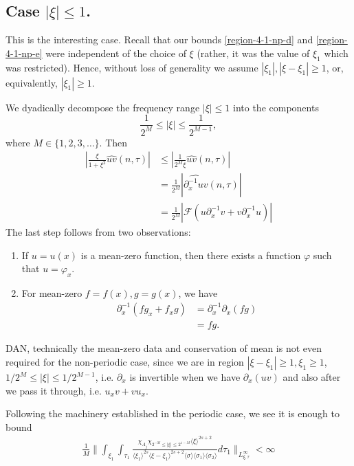 \documentclass[12pt,reqno]{amsart}
\numberwithin{equation}{section}  %
\newcommand{\wh}{\widehat}
\newcommand{\p}{\partial}
\begin{document}
\subsection{Case $| \xi| \le 1$.} 
\label{ssec:xisimxi1}

%
This is the interesting case. Recall that our bounds 
\eqref{region-4-1-np-d} and \eqref{region-4-1-np-e}
were independent of the choice of $\xi$ (rather, it was the value of $\xi_{1}$ which was restricted). Hence, without loss of generality we assume $| \xi_{1} |, | \xi - \xi_{1} | \ge 1$, or, equivalently, $|\xi_{1}| \ge 1$. 
\begin{framed}
We dyadically decompose the frequency range $| \xi | \le 1$ into the components \[\frac{1}{2^{M}} \le | \xi | \le \frac{1}{2^{M-1}},\] where $M \in \{1, 2, 3, \dots\}$. Then 
\begin{equation*}
\begin{split}
|\frac{\xi}{1 + \xi^{2}} \wh{uv}(n, \tau)| 
& \le | \frac{1}{2^{M} \xi} \wh{uv}(n, \tau)|
\\
& =\frac{1}{2^{M}} |\wh{\p_{x}^{-1} uv}(n, \tau)|
\\
& = \frac{1}{2^{M}}|\mathcal{F}(u \p_{x}^{-1}v + v \p_{x}^{-1} u)|
\end{split}
\end{equation*}
%
The last step follows from two observations: 
\begin{enumerate}
\item{} If $u = u(x)$ is a mean-zero function, then there exists a function $\varphi$ such that $u = \varphi_{x}$.  
\item{} For mean-zero $f=f(x),g=g(x)$, we have
%
%
\begin{equation*}
\begin{split}
\p_{x}^{-1}(fg_{x} + f_{x}g) 
& = \p_{x}^{-1} \p_{x}(fg)
\\
&= fg.
\end{split}
\end{equation*}
\end{enumerate}
DAN, technically the mean-zero data and conservation of mean is not even required for the non-periodic case, since we are in region $| \xi - \xi_{1} | \ge 1, \xi_{1} \ge 1$, $1/2^{M} \le | \xi | \le 1/2^{M-1}$, i.e. $\p_{x}$ is invertible when we have $\p_{x}(uv)$ and also after we pass it through, i.e. $u_{x} v + v u_{x}$.
\end{framed}
%
Following the machinery established in the periodic case, we see it is enough to bound
\begin{equation}
  \begin{split}
   \frac{1}{M} \|    \int_{\xi_{1}} \int_{\tau_{1}} \frac{\chi_{A_{j}} \chi_{2^{-M} \le |\xi | \le 2^{1-M} }\langle \xi \rangle ^{2s+2} }{\langle \xi_{1} \rangle ^{2s} \langle \xi-\xi_{1} \rangle ^{2s+2} 
    \langle \sigma \rangle   \langle \sigma_{1} \rangle \langle  \sigma_{2}
  \rangle} 
    d \tau_1  \|_{L^{\infty}_{\xi, \tau}} < \infty
  \end{split}
\end{equation}
\end{document}
